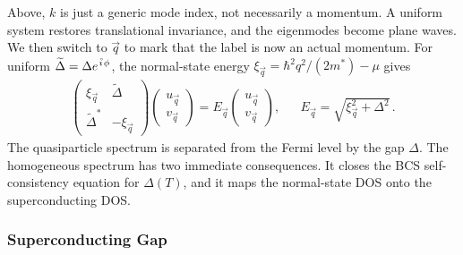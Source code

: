             Above, $k$ is just a generic mode index, not necessarily a momentum. A uniform system restores translational invariance, and the eigenmodes become plane waves. We then switch to $\vec q$ to mark that the label is now an actual momentum. For uniform $\widetilde{\Delta}=\Delta e^{\ima\phi}$, the normal-state energy $\xi_{\vec q}=\hbar^2q^2/(2m^\ast)-\mu$ gives
            \begin{align}
                \begin{pmatrix}
                    \xi_{\vec q} & \widetilde{\Delta}\\
                    \widetilde{\Delta}^{\ast} & -\xi_{\vec q}
                \end{pmatrix}
                \begin{pmatrix}u_{\vec q}\\v_{\vec q}\end{pmatrix}
                =E_{\vec q}
                \begin{pmatrix}u_{\vec q}\\v_{\vec q}\end{pmatrix},
                &&
                E_{\vec q}=\sqrt{\xi_{\vec q}^2+\Delta^2}\,.
                \label{eq:micro:bdg-homogeneous}
            \end{align}
            The quasiparticle spectrum is separated from the Fermi level by the gap $\Delta$. The homogeneous spectrum has two immediate consequences. It closes the BCS self-consistency equation for $\Delta(T)$, and it maps the normal-state DOS onto the superconducting DOS.

        \subsubsection*{Superconducting Gap}
        \label{subsubsec:micro:superconducting-gap}

